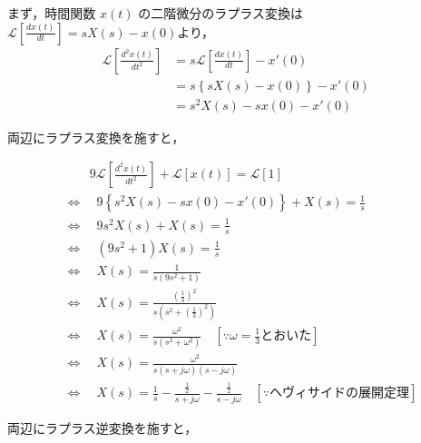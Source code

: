 \documentclass[a4paper,12pt]{article}
\begin{document}
\begin{tcolorbox}[title={[12] 次の微分方程式をラプラス変換を用いて解け.
  \[
      9 \frac{d^2 x(t)}{dt^2} + x(t) = 1 
  \]
  \quad ただし，初期値は，$x(0) = 0,\ x'(0) = 0$ とする．
  }]

  \quad まず，時間関数 \( x(t) \) の二階微分のラプラス変換は\( \mathcal{L} \left[ \frac{dx(t)}{dt} \right] = sX(s) - x(0) \)より，
    \vspace{-3mm}
    \begin{align*}
        \mathcal{L} \left[ \frac{d^2x(t)}{dt^2} \right] 
        &= s \mathcal{L} \left[ \frac{dx(t)}{dt} \right] - x'(0) \\
        &= s \left\{ sX(s) - x(0) \right\} - x'(0) \\
        &= s^2 X(s) - s x(0) - x'(0)
    \end{align*}


\newpage

\quad 両辺にラプラス変換を施すと，

\vspace{-6mm}

\begin{align*}
    &\qquad 9 \mathcal{L} \left[ \frac{d^2 x(t)}{dt^2} \right] + \mathcal{L}[x(t)] = \mathcal{L}[1] \\
    &\Leftrightarrow \quad 9\left\{s^2 X(s) - s x(0) - x'(0)\right\} + X(s) = \frac{1}{s} \\
    &\Leftrightarrow \quad 9s^2 X(s) + X(s) = \frac{1}{s} \\
    &\Leftrightarrow \quad (9s^2 + 1) X(s) = \frac{1}{s} \\
    &\Leftrightarrow \quad X(s) = \frac{1}{s(9s^2 + 1)} \\
    &\Leftrightarrow \quad X(s)= \frac{(\frac{1}{3})^2}{s(s^2 + \left( \frac{1}{3} \right)^2)} \\
    &\Leftrightarrow \quad X(s)= \frac{\omega^2}{s(s^2 + \omega^2)} \quad \left[\because \omega = \frac{1}{3} \text{とおいた}\right]\\
    &\Leftrightarrow \quad X(s)= \frac{\omega^2}{s(s + j \omega)(s - j \omega)} \\
    &\Leftrightarrow \quad X(s)= \frac{1}{s} - \frac{\frac{1}{2}}{s + j \omega} - \frac{\frac{1}{2}}{s - j \omega} \quad \left[ \because ヘヴィサイドの展開定理 \right]
\end{align*}

\quad 両辺にラプラス逆変換を施すと，

\vspace{-6mm}


\end{tcolorbox}
\end{document}
